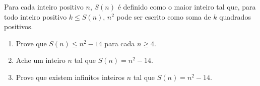Para cada inteiro positivo $n$, $S(n)$ é definido como o maior inteiro tal que, para todo inteiro positivo $k \le S(n)$, $n^2$ pode ser escrito como soma de $k$ quadrados positivos.

\begin{enumerate}[label = (\alph*)]
	\item Prove que $S(n) \leq n^{2} - 14$ para cada $n \geq 4$.
	\item Ache um inteiro $n$ tal que $S(n) = n^{2} - 14$.
	\item Prove que existem infinitos inteiros $n$ tal que $S(n) = n^{2}-14$.
\end{enumerate}
